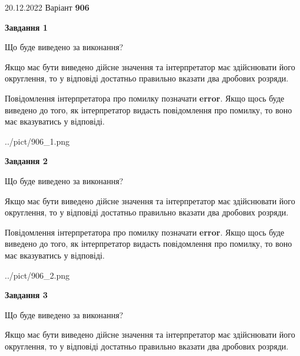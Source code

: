 \documentclass[12pt, ukrainian]{article}
\begin{document}
{20.12.2022 Варіант \No \textbf { 906 }\par}
{
\begin {Large}

{\begin {center}\textbf{Завдання 1}\end {center}}\par
Що буде виведено за виконання? \par

Якщо має бути виведено дійсне значення та інтерпретатор має здійснювати його округлення, 
то у відповіді достатньо правильно вказати два дробових розряди.

Повідомлення інтерпретатора про помилку позначати \textbf{error}.
Якщо щось буде виведено до того, як інтерпретатор видасть повідомлення про помилку, 
то воно має вказуватись у відповіді. \par

\begin{center}
	{../pict/906_1.png}
\end{center}
\newpage

{\begin {center}\textbf{Завдання 2}\end {center}}\par
Що буде виведено за виконання? \par

Якщо має бути виведено дійсне значення та інтерпретатор має здійснювати його округлення, 
то у відповіді достатньо правильно вказати два дробових розряди.

Повідомлення інтерпретатора про помилку позначати \textbf{error}.
Якщо щось буде виведено до того, як інтерпретатор видасть повідомлення про помилку, 
то воно має вказуватись у відповіді. \par

\begin{center}
	{../pict/906_2.png}
\end{center}
\newpage

{\begin {center}\textbf{Завдання 3}\end {center}}\par
Що буде виведено за виконання? \par

Якщо має бути виведено дійсне значення та інтерпретатор має здійснювати його округлення, 
то у відповіді достатньо правильно вказати два дробових розряди.


\end{Large}}
\end{document}
